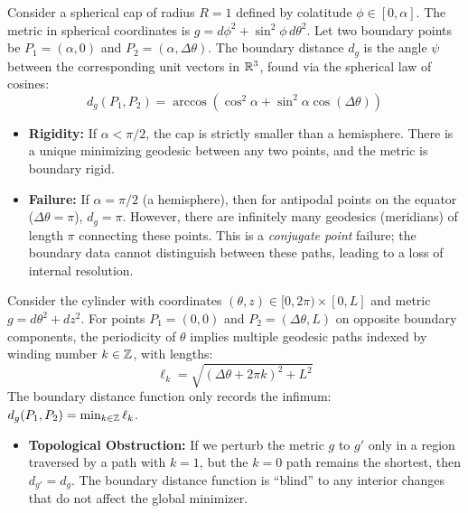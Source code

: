 \begin{example}
  Consider a spherical cap of radius $R=1$ defined by colatitude $\phi \in [0, \alpha]$. The metric in spherical coordinates is $g = d\phi^2 + \sin^2\phi \, d\theta^2$. Let two boundary points be $P_1 = (\alpha, 0)$ and $P_2 = (\alpha, \Delta \theta)$. The boundary distance $d_g$ is the angle $\psi$ between the corresponding unit vectors in $\mathbb{R}^3$, found via the spherical law of cosines:
  \begin{equation}
    d_g(P_1, P_2) = \arccos\left(\cos^2\alpha + \sin^2\alpha \cos(\Delta \theta)\right)
  \end{equation}

  \begin{itemize}
    \item \textbf{Rigidity:} If $\alpha < \pi/2$, the cap is strictly smaller than a hemisphere. There is a unique minimizing geodesic between any two points, and the metric is boundary rigid.
    \item \textbf{Failure:} If $\alpha = \pi/2$ (a hemisphere), then for antipodal points on the equator ($\Delta \theta = \pi$), $d_g = \pi$. However, there are infinitely many geodesics (meridians) of length $\pi$ connecting these points. This is a \emph{conjugate point} failure; the boundary data cannot distinguish between these paths, leading to a loss of internal resolution.
  \end{itemize}
\end{example}

\begin{example}
  Consider the cylinder with coordinates $(\theta, z) \in [0, 2\pi) \times [0, L]$ and metric $g = d\theta^2 + dz^2$. For points $P_1 = (0, 0)$ and $P_2 = (\Delta \theta, L)$ on opposite boundary components, the periodicity of $\theta$ implies multiple geodesic paths indexed by winding number $k \in \mathbb{Z}$, with lengths:
  \begin{equation}
    \ell_k = \sqrt{(\Delta \theta + 2\pi k)^2 + L^2}
  \end{equation}
  The boundary distance function only records the infimum: $d_g(P_1, P_2) = \min_{k \in \mathbb{Z}} \ell_k$.

  \begin{itemize}
    \item \textbf{Topological Obstruction:} If we perturb the metric $g$ to $g'$ only in a region traversed by a path with $k=1$, but the $k=0$ path remains the shortest, then $d_{g'} = d_g$. The boundary distance function is ``blind'' to any interior changes that do not affect the global minimizer.
  \end{itemize}
\end{example}

